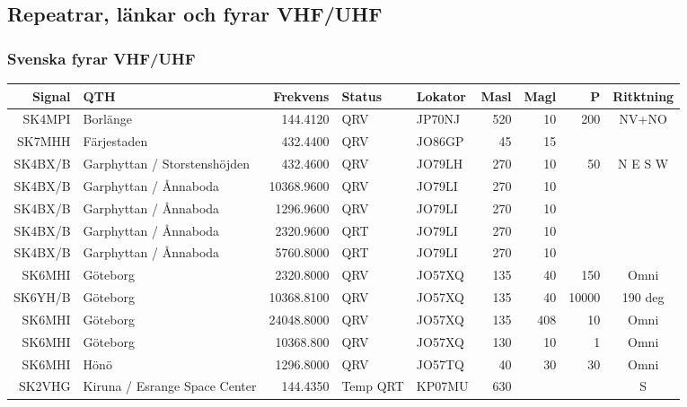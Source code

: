 \begin{landscape}
\subsection{Repeatrar, länkar och fyrar VHF/UHF}

\subsubsection{Svenska fyrar VHF/UHF}
\begin{tabular}{rlrllrrrc}
\textbf{Signal} & \textbf{QTH} & \textbf{Frekvens} & \textbf{Status} & \textbf{Lokator} & \textbf{Masl} & \textbf{Magl} & \textbf{P} & \textbf{Ritktning} \\ \hline

SK4MPI	& Borlänge                      & 144.4120   & QRV	& JP70NJ & 520 & 10  & 200    &	NV+NO    \\
SK7MHH	& Färjestaden                   & 432.4400   & QRV	& JO86GP & 45  & 15  &        &          \\
SK4BX/B	& Garphyttan / Storstenshöjden	& 432.4600   & QRV	& JO79LH & 270 & 10  & 50     &	N E S W  \\
SK4BX/B	& Garphyttan / Ånnaboda         & 10368.9600 & QRV	& JO79LI & 270 & 10  &        &          \\
SK4BX/B	& Garphyttan / Ånnaboda         & 1296.9600  & QRV	& JO79LI & 270 & 10  &        &          \\
SK4BX/B	& Garphyttan / Ånnaboda         & 2320.9600  & QRT	& JO79LI & 270 & 10  &        &          \\
SK4BX/B	& Garphyttan / Ånnaboda         & 5760.8000  & QRT	& JO79LI & 270 & 10  &        &          \\
SK6MHI	& Göteborg                      & 2320.8000  & QRV	& JO57XQ & 135 & 40  & 150    &	Omni     \\
SK6YH/B	& Göteborg                      & 10368.8100 & QRV	& JO57XQ & 135 & 40  & 10000  &	190 deg  \\
SK6MHI	& Göteborg                      & 24048.8000 & QRV	& JO57XQ & 135 & 408 & 10     &	Omni     \\
SK6MHI	& Göteborg                      & 10368.800  & QRV	& JO57XQ & 130 & 10  & 1      &	Omni     \\
SK6MHI	& Hönö                          & 1296.8000  & QRV	& JO57TQ & 40  & 30  & 30     &	Omni     \\
SK2VHG	& Kiruna / Esrange Space Center	& 144.4350   & Temp QRT	& KP07MU & 630 &     &        &	S        \\

\end{tabular}
\end{landscape}
